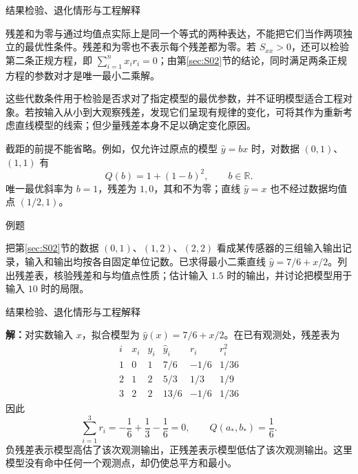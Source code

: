 \documentclass[aspectratio=169,10pt,fontset=fandol]{ctexbeamer}
\begin{document}
\begin{frame}[t,fragile]{结果检验、退化情形与工程解释}
\normalsize
{\normalsize
残差和为零与通过均值点实际上是同一个等式的两种表达，不能把它们当作两项独立的最优性条件。残差和为零也不表示每个残差都为零。若 $S_{xx}>0$，还可以检验第二条正规方程，即 $\sum_{i=1}^{n}x_i r_i=0$；由第\ref{sec:S02}节的结论，同时满足两条正规方程的参数对才是唯一最小二乘解。


}
{\normalsize
这些代数条件用于检验是否求对了指定模型的最优参数，并不证明模型适合工程对象。若按输入从小到大观察残差，发现它们呈现有规律的变化，可将其作为重新考虑直线模型的线索；但少量残差本身不足以确定变化原因。


}
{\normalsize
截距的前提不能省略。例如，仅允许过原点的模型 $\hat{y}=bx$ 时，对数据 $(0,1)$、$(1,1)$ 有
\[
Q(b)=1+(1-b)^2,\qquad b\in\mathbb{R}.
\]
唯一最优斜率为 $b=1$，残差为 $1,0$，其和不为零；直线 $\hat{y}=x$ 也不经过数据均值点 $(1/2,1)$。\par

}
\begin{block}{例题}
{\normalsize
把第\ref{sec:S02}节的数据 $(0,1)$、$(1,2)$、$(2,2)$ 看成某传感器的三组输入输出记录，输入和输出均按各自固定单位记数。已求得最小二乘直线 $\hat{y}=7/6+x/2$。列出残差表，核验残差和与均值点性质；估计输入 $1.5$ 时的输出，并讨论把模型用于输入 $10$ 时的局限。

}
\end{block}
\end{frame}
\begin{frame}[t,fragile]{结果检验、退化情形与工程解释}
\footnotesize
{\footnotesize
\par\noindent\textbf{解：}对实数输入 $x$，拟合模型为 $\hat{y}(x)=7/6+x/2$。在已有观测处，残差表为
\[
\begin{array}{c|r|r|r|r|r}
i&x_i&y_i&\hat{y}_i&r_i&r_i^2\\ \hline
1&0&1&7/6&-1/6&1/36\\
2&1&2&5/3&1/3&1/9\\
3&2&2&13/6&-1/6&1/36
\end{array}
\]
因此
\[
\sum_{i=1}^{3}r_i=-\frac16+\frac13-\frac16=0,
\qquad Q(a_*,b_*)=\frac16.
\]
负残差表示模型高估了该次观测输出，正残差表示模型低估了该次观测输出。这里模型没有命中任何一个观测点，却仍使总平方和最小。


}
\end{frame}
\end{document}
